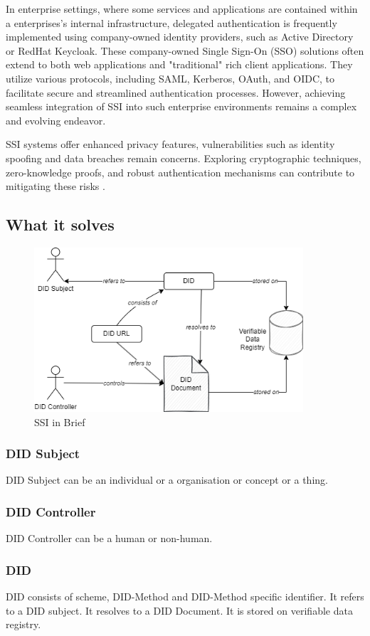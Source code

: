 In enterprise settings, where some services and applications are contained within a enterprises's internal infrastructure, delegated authentication is frequently implemented using company-owned identity providers, such as Active Directory or RedHat Keycloak. These company-owned Single Sign-On (SSO) solutions often extend to both web applications and "traditional" rich client applications. They utilize various protocols, including SAML, Kerberos, OAuth, and OIDC, to facilitate secure and streamlined authentication processes. However, achieving seamless integration of SSI into such enterprise environments remains a complex and evolving endeavor.

SSI systems offer enhanced privacy features, vulnerabilities such as identity spoofing and data breaches remain concerns. Exploring cryptographic techniques, zero-knowledge proofs, and robust authentication mechanisms can contribute to mitigating these risks \cite{503}.
\subsection*{What it solves}
\begin{figure}
        
        \includegraphics[width=10cm]{images/DID-Architecture.png}
        \centering
        \caption{SSI in Brief}
        \label{fig:my_label}
    \end{figure}
\subsubsection{DID Subject}
DID Subject can be an individual or a organisation or concept or a thing.
\subsubsection{DID Controller}
DID Controller can be a human or non-human.
\subsubsection{DID}
DID consists of scheme, DID-Method and DID-Method specific identifier. It refers to a DID subject. It resolves to a DID Document. It is stored on verifiable data registry.

